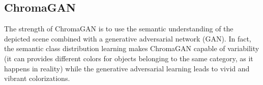\subsection{ChromaGAN}
The strength of ChromaGAN is to use the semantic understanding of the depicted scene combined with a generative adversarial network (GAN). In fact, the semantic class distribution learning makes ChromaGAN capable of variability (it can provides different colors for objects belonging to the same category, as it happens in reality) while the generative adversarial learning leads to vivid and vibrant colorizations.

